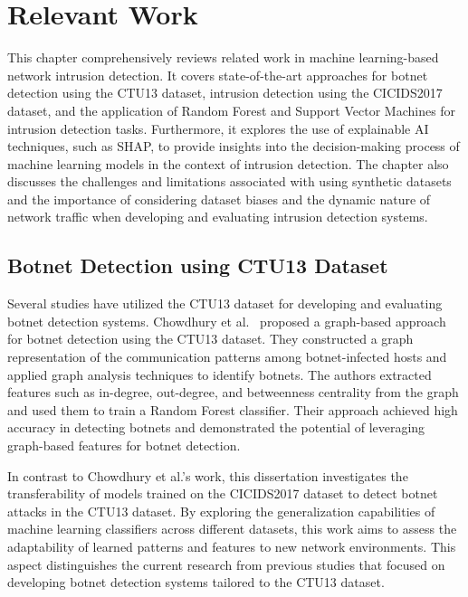 \chapter{Relevant Work}\label{chap:relevant-work}

This chapter comprehensively reviews related work in machine learning-based network intrusion detection. It covers state-of-the-art approaches for botnet detection using the CTU13 dataset, intrusion detection using the CICIDS2017 dataset, and the application of Random Forest and Support Vector Machines for intrusion detection tasks. Furthermore, it explores the use of explainable AI techniques, such as SHAP, to provide insights into the decision-making process of machine learning models in the context of intrusion detection. The chapter also discusses the challenges and limitations associated with using synthetic datasets and the importance of considering dataset biases and the dynamic nature of network traffic when developing and evaluating intrusion detection systems.

\section{Botnet Detection using CTU13 Dataset}

Several studies have utilized the CTU13 dataset for developing and evaluating botnet detection systems. Chowdhury et al.~\cite{chowdhury2017botnet} proposed a graph-based approach for botnet detection using the CTU13 dataset. They constructed a graph representation of the communication patterns among botnet-infected hosts and applied graph analysis techniques to identify botnets. The authors extracted features such as in-degree, out-degree, and betweenness centrality from the graph and used them to train a Random Forest classifier. Their approach achieved high accuracy in detecting botnets and demonstrated the potential of leveraging graph-based features for botnet detection.

In contrast to Chowdhury et al.’s work, this dissertation investigates the transferability of models trained on the CICIDS2017 dataset to detect botnet attacks in the CTU13 dataset. By exploring the generalization capabilities of machine learning classifiers across different datasets, this work aims to assess the adaptability of learned patterns and features to new network environments. This aspect distinguishes the current research from previous studies that focused on developing botnet detection systems tailored to the CTU13 dataset.

